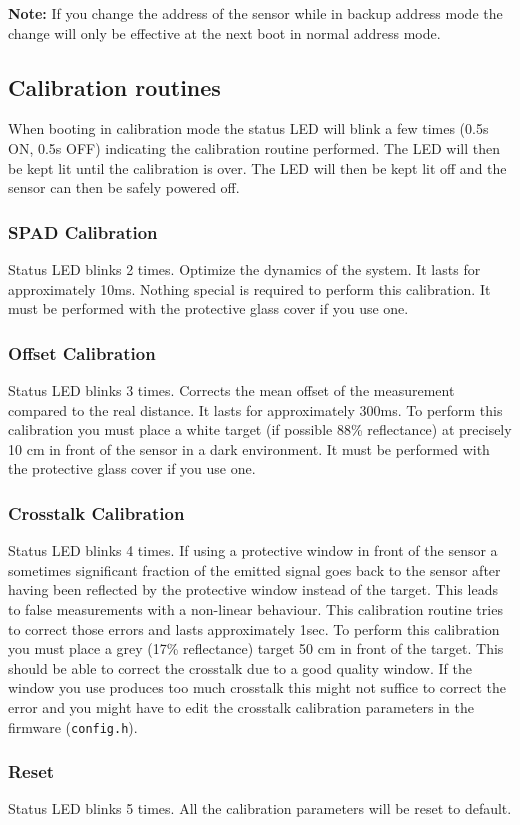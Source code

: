 \textbf{Note:} If you change the \iic address of the sensor while in backup address mode the change will only be effective at the next boot in normal \iic address mode.

\subsection{Calibration routines} %
When booting in calibration mode the status LED will blink a few times (0.5s ON, 0.5s OFF) indicating the calibration routine performed. The LED will then be kept lit until the calibration is over. The LED will then be kept lit off and the sensor can then be safely powered off.

\subsubsection{SPAD Calibration}
Status LED blinks 2 times. Optimize the dynamics of the system. It lasts for approximately 10ms. Nothing special is required to perform this calibration. It must be performed with the protective glass cover if you use one.

\subsubsection{Offset Calibration}
Status LED blinks 3 times. Corrects the mean offset of the measurement compared to the real distance. It lasts for approximately 300ms. To perform this calibration you must place a white target (if possible 88\% reflectance) at precisely 10 cm in front of the sensor in a dark environment. It must be performed with the protective glass cover if you use one.

\subsubsection{Crosstalk Calibration}
Status LED blinks 4 times.
If using a protective window in front of the sensor a sometimes significant fraction of the emitted signal goes back to the sensor after having been reflected by the protective window instead of the target. This leads to false measurements with a non-linear behaviour.
This calibration routine tries to correct those errors and lasts approximately 1sec. To perform this calibration you must place a grey (17\% reflectance) target 50 cm in front of the target. This should be able to correct the crosstalk due to a good quality window. If the window you use produces too much crosstalk this might not suffice to correct the error and you might have to edit the crosstalk calibration parameters in the firmware (\texttt{config.h}).


\subsubsection{Reset}
Status LED blinks 5 times.
All the calibration parameters will be reset to default.